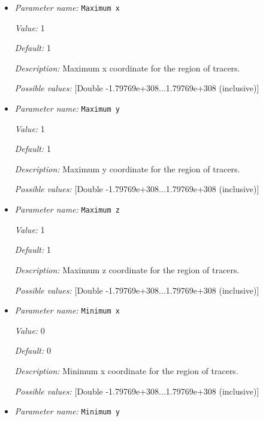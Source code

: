\begin{itemize}
\item {\it Parameter name:} {\tt Maximum x}
\label{parameters:Postprocess/Tracers/Generator/Uniform box/Maximum x}


{\it Value:} 1


{\it Default:} 1


{\it Description:} Maximum x coordinate for the region of tracers.


{\it Possible values:} [Double -1.79769e+308...1.79769e+308 (inclusive)]
\item {\it Parameter name:} {\tt Maximum y}
\label{parameters:Postprocess/Tracers/Generator/Uniform box/Maximum y}


{\it Value:} 1


{\it Default:} 1


{\it Description:} Maximum y coordinate for the region of tracers.


{\it Possible values:} [Double -1.79769e+308...1.79769e+308 (inclusive)]
\item {\it Parameter name:} {\tt Maximum z}
\label{parameters:Postprocess/Tracers/Generator/Uniform box/Maximum z}


{\it Value:} 1


{\it Default:} 1


{\it Description:} Maximum z coordinate for the region of tracers.


{\it Possible values:} [Double -1.79769e+308...1.79769e+308 (inclusive)]
\item {\it Parameter name:} {\tt Minimum x}
\label{parameters:Postprocess/Tracers/Generator/Uniform box/Minimum x}


{\it Value:} 0


{\it Default:} 0


{\it Description:} Minimum x coordinate for the region of tracers.


{\it Possible values:} [Double -1.79769e+308...1.79769e+308 (inclusive)]
\item {\it Parameter name:} {\tt Minimum y}
\label{parameters:Postprocess/Tracers/Generator/Uniform box/Minimum y}



\end{itemize}
